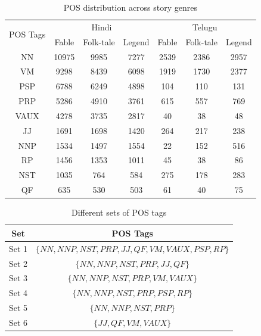 \documentclass[times, 11pt, a4paper]{article}
\begin{document}
		
\begin{table}[!htbp]
\renewcommand{\arraystretch}{1}
\caption{POS distribution across story genres\label{POS Distribution}} 
\footnotesize\setlength{\tabcolsep}{6pt}
\centering
\begin{tabular}{|c|c|c|c||c|c|c|}
\hline
\multirow{2}{*}{POS Tags} & \multicolumn{3}{c||}{Hindi} & \multicolumn{3}{c|}{Telugu} \\ \cline{2-7} 
 & Fable & Folk-tale & Legend & Fable & Folk-tale & Legend \\ \hline
NN & 10975 & 9985 & 7277 & 2539 & 2386 & 2957 \\ \hline
VM & 9298 & 8439 & 6098 & 1919 & 1730 & 2377 \\ \hline
PSP & 6788 & 6249 & 4898 & 104 & 110 & 131 \\ \hline
PRP & 5286 & 4910 & 3761 & 615 & 557 & 769 \\ \hline
VAUX & 4278 & 3735 & 2817 & 40 & 38 & 48 \\ \hline
JJ & 1691 & 1698 & 1420 & 264 & 217 & 238 \\ \hline
NNP & 1534 & 1497 & 1554 & 22 & 152 & 516 \\ \hline
RP & 1456 & 1353 & 1011 & 45 & 38 & 86 \\ \hline
NST & 1035 & 764 & 584 & 275 & 178 & 283 \\ \hline
QF & 635 & 530 & 503 & 61 & 40 & 75 \\ \hline
\end{tabular}
\end{table}

 
\begin{table}[h]
\renewcommand{\arraystretch}{0.9}
\caption{Different sets of POS tags\label{Table: POS Sets}} 
\centering
\begin{tabular}{|c|c|}
\hline
Set & POS Tags\\
\hline
Set 1 & $\lbrace NN, NNP, NST, PRP, JJ, QF, VM, VAUX, PSP, RP \rbrace$ \\ \hline
Set 2 & $\lbrace NN, NNP, NST, PRP, JJ, QF \rbrace$\\ \hline
Set 3 & $\lbrace NN, NNP, NST, PRP, VM, VAUX \rbrace$ \\ \hline
Set 4 & $\lbrace NN, NNP, NST, PRP, PSP, RP \rbrace$\\ \hline
Set 5 & $\lbrace NN, NNP, NST, PRP \rbrace$\\ \hline
Set 6 & $\lbrace JJ, QF, VM, VAUX \rbrace$\\
 \hline
\end{tabular}
\end{table}
	
\end{document}
